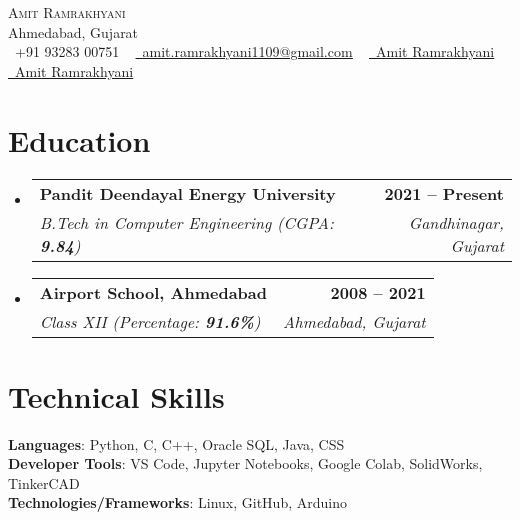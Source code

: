 \documentclass[letterpaper,11pt]{article}
\makeatletter
\newcommand{\resumeSubheading}[4]{
  \vspace{-2pt}\item
    \begin{tabular*}{1.0\textwidth}[t]{l@{\extracolsep{\fill}}r}
      \textbf{#1} & \textbf{\small #2} \\
      \textit{\small#3} & \textit{\small #4} \\
    \end{tabular*}\vspace{-7pt}
}
\newcommand{\resumeSubHeadingListStart}{\begin{itemize}[leftmargin=0.0in, label={}]}
\newcommand{\resumeSubHeadingListEnd}{\end{itemize}}
\makeatother
\begin{document}

\begin{center}
    {\Huge \scshape Amit Ramrakhyani} \\ \vspace{1pt}
    Ahmedabad, Gujarat \\ \vspace{1pt}
    \small \raisebox{-0.1\height}\faPhone\ +91 93283 00751 ~ \href{mailto:amit.ramrakhyani1109@gmail.com}{\raisebox{-0.2\height}\faEnvelope\  \underline{amit.ramrakhyani1109@gmail.com}} ~ 
    \href{https://www.linkedin.com/in/amit-ramrakhyani-73b076214/}{\raisebox{-0.2\height}\faLinkedin\ \underline{Amit Ramrakhyani}}  ~
    \href{https://github.com/Amit-Ramrakhyani}{\raisebox{-0.2\height}\faGithub\ \underline{Amit Ramrakhyani}}
    \vspace{-8pt}
\end{center}


\section{Education}
  \resumeSubHeadingListStart
    \resumeSubheading
      {Pandit Deendayal Energy University}{2021 -- Present}
      {B.Tech in Computer Engineering (CGPA: \textbf{9.84})}{Gandhinagar, Gujarat}
    \resumeSubheading  
      {Airport School, Ahmedabad}{2008 -- 2021}
      {Class XII (Percentage: \textbf{91.6\%})}{Ahmedabad, Gujarat}
  \resumeSubHeadingListEnd

\section{Technical Skills}
 \begin{itemize}[leftmargin=0.15in, label={}]
    \small{\item{
     \textbf{Languages}{: Python, C, C++, Oracle SQL, Java, CSS} \\
     \textbf{Developer Tools}{: VS Code, Jupyter Notebooks, Google Colab, SolidWorks, TinkerCAD} \\
     \textbf{Technologies/Frameworks}{: Linux, GitHub, Arduino} \\
    }}
 \end{itemize}
 \vspace{-16pt}
\end{document}
